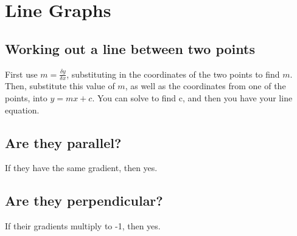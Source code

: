 \section{Line Graphs}
\subsection{Working out a line between two points}
First use $m=\frac{\delta y}{\delta x}$, substituting in the coordinates of the two points to find $m$. Then, substitute this value of $m$, as well as the coordinates from one of the points, into $y=mx+c$. You can solve to find c, and then you have your line equation.
\subsection{Are they parallel?}
If they have the same gradient, then yes.
\subsection{Are they perpendicular?}
If their gradients multiply to -1, then yes.
